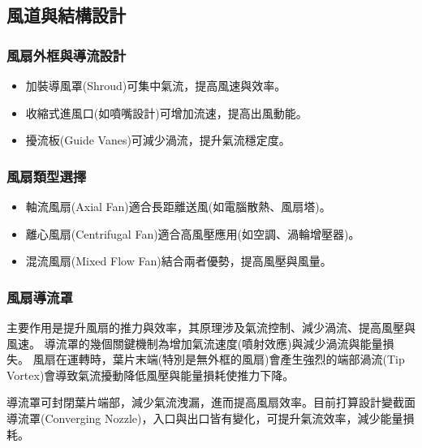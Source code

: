 \documentclass[12pt]{article}       %
\begin{document}
\subsection{風道與結構設計} 
\subsubsection{風扇外框與導流設計}
\begin{itemize}
    \item 加裝導風罩(Shroud)可集中氣流，提高風速與效率。
    \item 收縮式進風口(如噴嘴設計)可增加流速，提高出風動能。
    \item 擾流板(Guide Vanes)可減少渦流，提升氣流穩定度。
\end{itemize}

\subsubsection{風扇類型選擇}
\begin{itemize}
    \item 軸流風扇(Axial Fan)適合長距離送風(如電腦散熱、風扇塔)。
    \item 離心風扇(Centrifugal Fan)適合高風壓應用(如空調、渦輪增壓器)。

    \item 混流風扇(Mixed Flow Fan)結合兩者優勢，提高風壓與風量。
\end{itemize}

\subsubsection{風扇導流罩}
\hspace{2em}主要作用是提升風扇的推力與效率，其原理涉及氣流控制、減少渦流、提高風壓與風速。
導流罩的幾個關鍵機制為增加氣流速度(噴射效應)與減少渦流與能量損失。
風扇在運轉時，葉片末端(特別是無外框的風扇)會產生強烈的端部渦流(Tip Vortex)會導致氣流擾動降低風壓與能量損耗使推力下降。

導流罩可封閉葉片端部，減少氣流洩漏，進而提高風扇效率。目前打算設計變截面導流罩(Converging Nozzle)，入口與出口皆有變化，可提升氣流效率，減少能量損耗。
\end{document}
